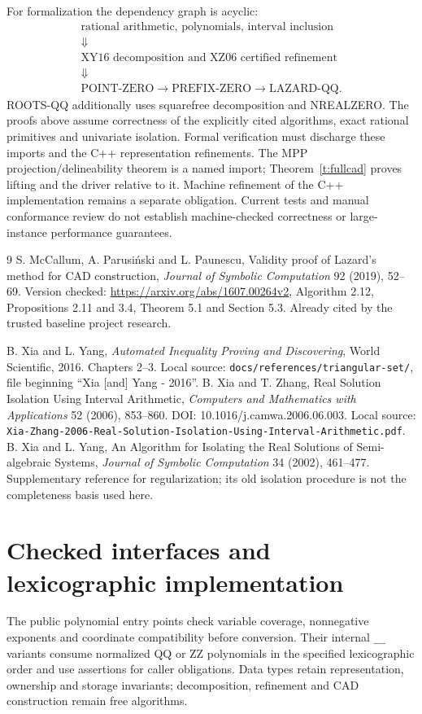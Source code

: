 \documentclass[11pt]{article}
\theoremstyle{definition}
\newcommand{\alg}[1]{\textsc{#1}}
\begin{document}
For formalization the dependency graph is acyclic:
\[
\begin{gathered}
\text{rational arithmetic, polynomials, interval inclusion}\\
\Downarrow\\
\text{XY16 decomposition and XZ06 certified refinement}\\
\Downarrow\\
\text{POINT-ZERO}\longrightarrow\text{PREFIX-ZERO}\longrightarrow\text{LAZARD-QQ}.
\end{gathered}
\]
\noindent\alg{ROOTS-QQ} additionally uses squarefree decomposition and NREALZERO.
The proofs above assume correctness of the explicitly cited algorithms, exact
rational primitives and univariate isolation. Formal verification must discharge
these imports and the C++ representation refinements. The MPP projection/delineability theorem is a named import;
Theorem~\ref{t:fullcad} proves lifting and the driver relative to it.
Machine refinement of the C++ implementation remains a separate obligation.
Current tests and manual conformance review do not establish machine-checked
correctness or large-instance performance guarantees.

\begin{thebibliography}{9}
 S. McCallum, A. Parusi\'nski and L. Paunescu,
Validity proof of Lazard's method for CAD construction,
\emph{Journal of Symbolic Computation} 92 (2019), 52--69.
Version checked: \url{https://arxiv.org/abs/1607.00264v2},
Algorithm 2.12, Propositions 2.11 and 3.4, Theorem 5.1 and Section 5.3.
Already cited by the trusted baseline project research.

 B. Xia and L. Yang, \emph{Automated Inequality Proving and
Discovering}, World Scientific, 2016. Chapters 2--3. Local source:
\texttt{docs/references/triangular-set/}, file beginning ``Xia [and] Yang - 2016''.
 B. Xia and T. Zhang, Real Solution Isolation Using Interval
Arithmetic, \emph{Computers and Mathematics with Applications} 52 (2006),
853--860. DOI: 10.1016/j.camwa.2006.06.003. Local source:
\texttt{Xia-Zhang-2006-Real-Solution-Isolation-Using-Interval-Arithmetic.pdf}.
 B. Xia and L. Yang, An Algorithm for Isolating the Real Solutions
of Semi-algebraic Systems, \emph{Journal of Symbolic Computation} 34 (2002),
461--477. Supplementary reference for regularization; its old isolation procedure
is not the completeness basis used here.
\end{thebibliography}

\section{Checked interfaces and lexicographic implementation}
The public polynomial entry points check variable coverage, nonnegative exponents
and coordinate compatibility before conversion. Their internal \texttt{\_\_}
variants consume normalized QQ or ZZ polynomials in the specified lexicographic
order and use assertions for caller obligations. Data types retain representation,
ownership and storage invariants; decomposition, refinement and CAD construction
remain free algorithms.
\end{document}
